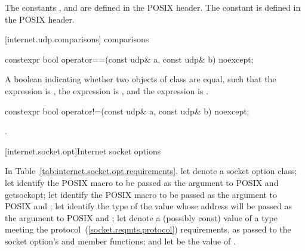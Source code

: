 \pnum
\begin{note} The constants ,  and  are defined in the POSIX  header. The constant  is defined in the POSIX  header. \end{note}


[internet.udp.comparisons]{ comparisons}

\begin{itemdecl}
constexpr bool operator==(const udp& a, const udp& b) noexcept;
\end{itemdecl}

\begin{itemdescr}
\pnum
\returns A boolean indicating whether two objects of class  are equal, such that the expression  is , the expression  is , and the expression  is .
\end{itemdescr}

\begin{itemdecl}
constexpr bool operator!=(const udp& a, const udp& b) noexcept;
\end{itemdecl}

\begin{itemdescr}
\pnum
\returns {}.
\end{itemdescr}




[internet.socket.opt]{Internet socket options}

\pnum
In Table~\ref{tab:internet.socket.opt.requirements}, let  denote a socket option class; let  identify the POSIX macro to be passed as the  argument to POSIX  and getsockopt; let  identify the POSIX macro to be passed as the  argument to POSIX  and ; let  identify the type of the value whose address will be passed as the  argument to POSIX  and ;
let  denote a (possibly const) value of a type meeting the protocol~(\ref{socket.reqmts.protocol}) requirements,
as passed to the socket option's  and  member functions;
and let  be the value of .

